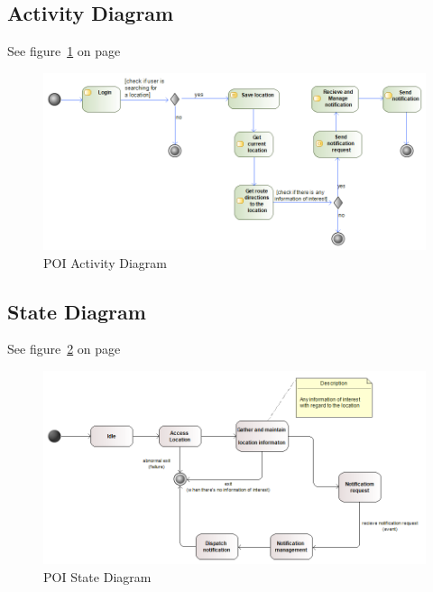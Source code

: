  \subsection{Activity Diagram}
See figure~\ref{fig:POI_Activity_Diagram} on page~\pageref{fig:POI_Activity_Diagram}
\begin{figure}
	\centering
	\includegraphics[scale=0.54]{POI/poi_activity_diagram.png}
	\caption{POI Activity Diagram}
	\label{fig:POI_Activity_Diagram}
\end{figure}

 \subsection{State Diagram}
See figure~\ref{fig:POI_State_Diagram} on page~\pageref{fig:POI_State_Diagram}
\begin{figure}
	\centering
	\includegraphics[scale=0.54]{POI/poi_state_diagram.png}
	\caption{POI State Diagram}
	\label{fig:POI_State_Diagram}
\end{figure}
		

